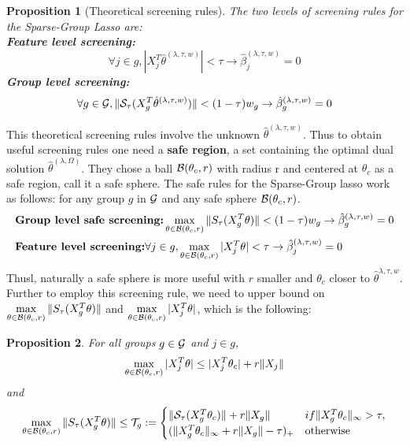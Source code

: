 \documentclass{article}
\def\cS{{\cal S}}
\def\cG{{\cal G}}
\def\cb{{\cal B}}
\newtheorem{proposition}{Proposition}[section]
\begin{document}
\begin{proposition}[Theoretical screening rules]
The two levels of screening rules for the Sparse-Group Lasso are:\\
\textbf{Feature level screening:}
$$
\forall j \in g, |X_j^T \hat{\theta}^{(\lambda,\tau,w)}| < \tau \rightarrow \hat{\beta}_j^{(\lambda,\tau,w)} = 0
$$
\textbf{Group level screening:}
$$
\forall g \in \cG, \|\cS_{\tau}(X_g^T \hat{\theta}^{(\lambda,\tau,w)})\|  < (1-\tau)w_g \rightarrow \hat{\beta}_g^{(\lambda,\tau,w)} = 0
$$
\end{proposition}
This theoretical screening rules involve the unknown $\hat{\theta}^{(\lambda,\tau,w)}$. Thus to obtain useful screening rules one need a \textbf{safe region}, a set containing the optimal dual solution $\hat{\theta}^{(\lambda,\Omega)}$.  They chose a ball $\cb( \theta_c, r)$ with radius r and centered at $\theta_c$ as a safe region, call it a safe sphere. The safe rules for the Sparse-Group lasso work as follows: for any group $g$ in $\cG$ and any safe sphere $\cb(\theta_c,r)$.
\begin{align}
& \textbf{Group level safe screening:} \max\limits_{\theta \in \cb(\theta_c, r)} \|S_{\tau} (X_g^T \theta)\| < (1-\tau) w_g \rightarrow \hat{\beta}_g^{(\lambda,\tau,w)} = 0 \\
& \textbf{Feature level screening:} \forall j \in g, \max\limits_{\theta \in \cb(\theta_c,r)} |X_j^T \theta| < \tau \rightarrow \hat{\beta}_j^{(\lambda,\tau,w)} = 0
\end{align}
Thusl, naturally a safe sphere is more useful with $r$ smaller and $\theta_c$ closer to $\hat{\theta}^{\lambda,\tau,w}$.  Further to employ this screening rule, we need to upper bound on $\max\limits_{\theta \in \cb(\theta_c, r)} \|S_{\tau} (X_g^T \theta)\|$ and $\max\limits_{\theta \in \cb(\theta_c,r)} |X_j^T \theta|$, which is the following:
\begin{proposition}
For all groups $g \in \cG$ and $j \in g$, \\
\begin{align}
\max\limits_{\theta \in \cb(\theta_c,r)} |X_j^T \theta| \leq |X_j^T \theta_c| + r \|X_j\| 
\end{align}
and 
\begin{align}
\max\limits_{\theta \in \cb(\theta_c, r)} \|S_{\tau} (X_g^T \theta)\| \leq {\cal T}_g := \begin{cases} \|\cS_{\tau} (X_g^T \theta_c)\| + r\|X_g\| & if \|X_g^T \theta_c\|_{\infty} > \tau, \\ 
(\|X_g^T \theta_c\|_{\infty} + r\|X_g\| - \tau)_{+}  & \text{otherwise} \end{cases}
\end{align}
\end{proposition}
\end{document}
